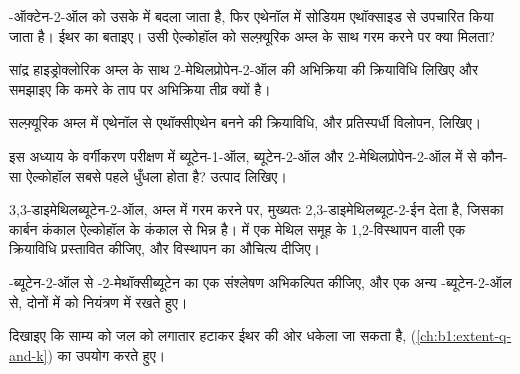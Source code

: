 \begin{exercise}[$\star\star$]\label{exo:b1:alcohol-activation:6}
-ऑक्टेन-2-ऑल को उसके  में बदला जाता है, फिर
एथेनॉल में सोडियम एथॉक्साइड से उपचारित किया जाता है। ईथर का  बताइए। उसी
ऐल्कोहॉल को सल्फ़्यूरिक अम्ल के साथ गरम करने पर क्या मिलता?
\end{exercise}

\begin{exercise}[$\star\star$]\label{exo:b1:alcohol-activation:7}
सांद्र हाइड्रोक्लोरिक अम्ल के साथ 2-मेथिलप्रोपेन-2-ऑल की अभिक्रिया की
क्रियाविधि लिखिए और समझाइए कि कमरे के ताप पर अभिक्रिया तीव्र क्यों
है।
\end{exercise}

\begin{exercise}[$\star\star$]\label{exo:b1:alcohol-activation:8}
सल्फ़्यूरिक अम्ल में एथेनॉल से एथॉक्सीएथेन बनने की क्रियाविधि, और
प्रतिस्पर्धी विलोपन, लिखिए।
\end{exercise}

\begin{exercise}[$\star\star$]\label{exo:b1:alcohol-activation:9}
इस अध्याय के वर्गीकरण परीक्षण में ब्यूटेन-1-ऑल, ब्यूटेन-2-ऑल और
2-मेथिलप्रोपेन-2-ऑल में से कौन-सा ऐल्कोहॉल सबसे पहले धुँधला होता है? उत्पाद
लिखिए।
\end{exercise}

\begin{exercise}[$\star\star\star$]\label{exo:b1:alcohol-activation:10}
3,3-डाइमेथिलब्यूटेन-2-ऑल, अम्ल में गरम करने पर, मुख्यतः
2,3-डाइमेथिलब्यूट-2-ईन देता है, जिसका कार्बन कंकाल
ऐल्कोहॉल के कंकाल से भिन्न है।  में एक मेथिल समूह के 1,2-विस्थापन वाली
एक क्रियाविधि प्रस्तावित कीजिए, और विस्थापन का औचित्य दीजिए।
\end{exercise}

\begin{exercise}[$\star\star\star$]\label{exo:b1:alcohol-activation:11}
-ब्यूटेन-2-ऑल से -2-मेथॉक्सीब्यूटेन का एक संश्लेषण अभिकल्पित कीजिए,
और एक अन्य -ब्यूटेन-2-ऑल से, दोनों में  को
नियंत्रण में रखते हुए।
\end{exercise}

\begin{exercise}[$\star\star\star$]\label{exo:b1:alcohol-activation:12}
दिखाइए कि साम्य  को
जल को लगातार हटाकर ईथर की ओर धकेला जा सकता है,  (\cref{ch:b1:extent-q-and-k}) का उपयोग करते हुए।
\end{exercise}

